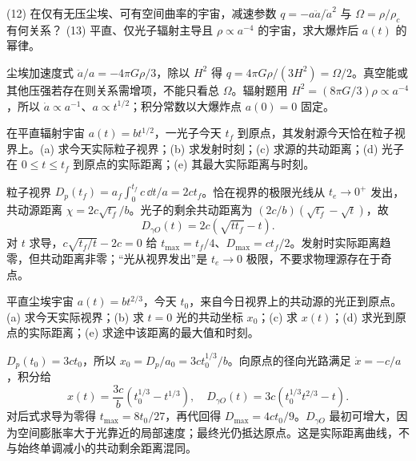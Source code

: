 \begin{exercise}
(12) 在仅有无压尘埃、可有空间曲率的宇宙，减速参数 $q=-a\ddot a/\dot a^2$ 与 $\Omega=\rho/\rho_c$ 有何关系？
(13) 平直、仅光子辐射主导且 $\rho\propto a^{-4}$ 的宇宙，求大爆炸后 $a(t)$ 的幂律。
\end{exercise}
\begin{solution}
尘埃加速度式 $\ddot a/a=-4\pi G\rho/3$，除以 $H^2$ 得 $q=4\pi G\rho/(3H^2)=\Omega/2$。真空能或其他压强若存在则关系需增项，不能只看总 $\Omega$。辐射题用 $H^2=(8\pi G/3)\rho\propto a^{-4}$，所以 $\dot a\propto a^{-1}$、$a\propto t^{1/2}$；积分常数以大爆炸点 $a(0)=0$ 固定。
\end{solution}

\begin{exercise}
在平直辐射宇宙 $a(t)=bt^{1/2}$，一光子今天 $t_f$ 到原点，其发射源今天恰在粒子视界上。(a) 求今天实际粒子视界；(b) 求发射时刻；(c) 求源的共动距离；(d) 光子在 $0\le t\le t_f$ 到原点的实际距离；(e) 其最大实际距离与时刻。
\end{exercise}
\begin{solution}
粒子视界 $D_p(t_f)=a_f\int_0^{t_f}c\,\dd t/a=2ct_f$。恰在视界的极限光线从 $t_e\to0^+$ 发出，共动源距离 $\chi=2c\sqrt{t_f}/b$。光子的剩余共动距离为 $(2c/b)(\sqrt{t_f}-\sqrt t)$，故
\[
D_{\gamma O}(t)=2c(\sqrt{tt_f}-t).
\]
对 $t$ 求导，$c\sqrt{t_f/t}-2c=0$ 给 $t_{\max}=t_f/4$、$D_{\max}=ct_f/2$。发射时实际距离趋零，但共动距离非零；“光从视界发出”是 $t_e\to0$ 极限，不要求物理源存在于奇点。
\end{solution}

\begin{exercise}
平直尘埃宇宙 $a(t)=bt^{2/3}$，今天 $t_0$，来自今日视界上的共动源的光正到原点。(a) 求今天实际视界；(b) 求 $t=0$ 光的共动坐标 $x_0$；(c) 求 $x(t)$；(d) 求光到原点的实际距离；(e) 求途中该距离的最大值和时刻。
\end{exercise}
\begin{solution}
$D_p(t_0)=3ct_0$，所以 $x_0=D_p/a_0=3ct_0^{1/3}/b$。向原点的径向光路满足 $\dot x=-c/a$，积分给
\[
x(t)=\frac{3c}{b}(t_0^{1/3}-t^{1/3}),\quad
D_{\gamma O}(t)=3c(t_0^{1/3}t^{2/3}-t).
\]
对后式求导为零得 $t_{\max}=8t_0/27$，再代回得 $D_{\max}=4ct_0/9$。$D_{\gamma O}$ 最初可增大，因为空间膨胀率大于光靠近的局部速度；最终光仍抵达原点。这是实际距离曲线，不与始终单调减小的共动剩余距离混同。
\end{solution}

